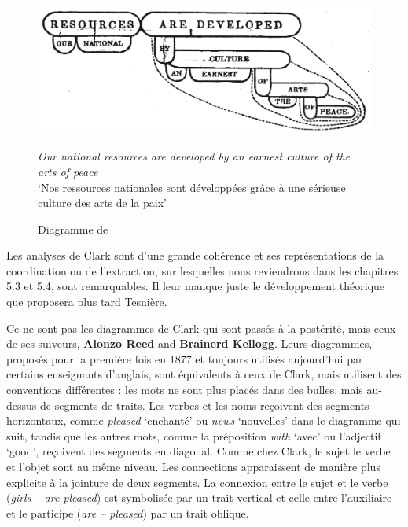 {    \begin{figure}
    \caption{\label{fig:}Diagramme de \citet{Clark1847}}
    \includegraphics[width=\textwidth]{figures/vol1syntaxe2-img013.png}\medskip\\
    \raggedright\textit{Our national resources are developed by an earnest culture of the arts of peace}\\
    ‘Nos ressources nationales sont développées grâce à une sérieuse culture des arts de la paix’
    \end{figure}

    Les analyses de Clark sont d’une grande cohérence et ses représentations de la coordination ou de l’extraction, sur lesquelles nous reviendrons dans les chapitres 5.3 et 5.4, sont remarquables. Il leur manque juste le développement théorique que proposera plus tard Tesnière.

    Ce ne sont pas les diagrammes de Clark qui sont passés à la postérité, mais ceux de ses suiveurs, \textbf{Alonzo Reed} and \textbf{Brainerd Kellogg}. Leurs diagrammes, proposés pour la première fois en 1877 et toujours utilisés aujourd’hui par certains enseignants d’anglais, sont équivalents à ceux de Clark, mais utilisent des conventions différentes : les mots ne sont plus placés dans des bulles, mais au-dessus de segments de traits. Les verbes et les noms reçoivent des segments horizontaux, comme \textit{pleased} ‘enchanté’ ou \textit{news} ‘nouvelles’ dans le diagramme qui suit, tandis que les autres mots, comme la préposition \textit{with} ‘avec’ ou l’adjectif ‘good’, reçoivent des segments en diagonal. Comme chez Clark, le sujet le verbe et l’objet sont au même niveau. Les connections apparaissent de manière plus explicite à la jointure de deux segments. La connexion entre le sujet et le verbe (\textit{girls – are pleased}) est symbolisée par un trait vertical et celle entre l’auxiliaire et le participe (\textit{are – pleased}) par un trait oblique.

}
